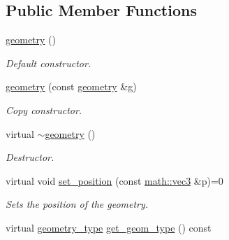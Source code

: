 \subsection*{Public Member Functions}
\begin{DoxyCompactItemize}
\item 
\mbox{\label{classphysim_1_1geometry_1_1geometry_ab112dc5df92c91a717b55fc46df2236c}} 
\hyperlink{classphysim_1_1geometry_1_1geometry_ab112dc5df92c91a717b55fc46df2236c}{geometry} ()
\begin{DoxyCompactList}\small\item\em Default constructor. \end{DoxyCompactList}\item 
\mbox{\label{classphysim_1_1geometry_1_1geometry_afd1b607926bda6adbfcd9fe3c1a7a62c}} 
\hyperlink{classphysim_1_1geometry_1_1geometry_afd1b607926bda6adbfcd9fe3c1a7a62c}{geometry} (const \hyperlink{classphysim_1_1geometry_1_1geometry}{geometry} \&g)
\begin{DoxyCompactList}\small\item\em Copy constructor. \end{DoxyCompactList}\item 
\mbox{\label{classphysim_1_1geometry_1_1geometry_a99e8e8fea45437f600ba9338c259d8cc}} 
virtual \hyperlink{classphysim_1_1geometry_1_1geometry_a99e8e8fea45437f600ba9338c259d8cc}{$\sim$geometry} ()
\begin{DoxyCompactList}\small\item\em Destructor. \end{DoxyCompactList}\item 
virtual void \hyperlink{classphysim_1_1geometry_1_1geometry_a45bffd27f5e8d59375762cf7987625e1}{set\+\_\+position} (const \hyperlink{structphysim_1_1math_1_1vec3}{math\+::vec3} \&p)=0
\begin{DoxyCompactList}\small\item\em Sets the position of the geometry. \end{DoxyCompactList}\item 
\mbox{\label{classphysim_1_1geometry_1_1geometry_ab95d30d3402d58ab8f638fca6caf8376}} 
virtual \hyperlink{namespacephysim_1_1geometry_a60e1ee7ea6f443f8ec9341ca7f12f1b7}{geometry\+\_\+type} \hyperlink{classphysim_1_1geometry_1_1geometry_ab95d30d3402d58ab8f638fca6caf8376}{get\+\_\+geom\+\_\+type} () const

\end{DoxyCompactItemize}
